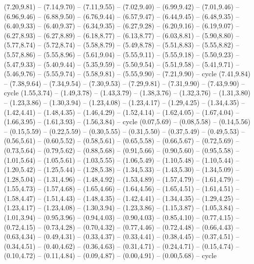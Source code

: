 \expandafter\def\csname geo:gebiet:heute-SWE\endcsname{
  (7.20,9.81) -- (7.14,9.70) -- (7.11,9.55) -- (7.02,9.40) -- (6.99,9.42) -- (7.01,9.46) -- (6.96,9.46) -- (6.88,9.50) -- (6.76,9.44) -- (6.57,9.47) -- (6.44,9.45) -- (6.48,9.35) -- (6.40,9.33) -- (6.40,9.37) -- (6.34,9.35) -- (6.27,9.28) -- (6.20,9.16) -- (6.19,9.07) -- (6.27,8.93) -- (6.27,8.89) -- (6.18,8.77) -- (6.13,8.77) -- (6.03,8.81) -- (5.90,8.80) -- (5.77,8.74) -- (5.72,8.74) -- (5.58,8.79) -- (5.49,8.78) -- (5.51,8.83) -- (5.55,8.82) -- (5.57,8.86) -- (5.55,8.96) -- (5.61,9.04) -- (5.55,9.11) -- (5.55,9.18) -- (5.50,9.23) -- (5.47,9.33) -- (5.40,9.44) -- (5.35,9.59) -- (5.50,9.54) -- (5.51,9.58) -- (5.41,9.71) -- (5.46,9.76) -- (5.55,9.74) -- (5.58,9.81) -- (5.55,9.90) -- (7.21,9.90) -- cycle
  (7.41,9.84) -- (7.38,9.64) -- (7.34,9.54) -- (7.30,9.53) -- (7.29,9.81) -- (7.31,9.90) -- (7.43,9.90) -- cycle}
\expandafter\def\csname geo:gebiet:heute-LUX\endcsname{
  (1.55,3.74) -- (1.49,3.78) -- (1.43,3.79) -- (1.38,3.76) -- (1.32,3.76) -- (1.31,3.80) -- (1.23,3.86) -- (1.30,3.94) -- (1.23,4.08) -- (1.23,4.17) -- (1.29,4.25) -- (1.34,4.35) -- (1.42,4.41) -- (1.48,4.35) -- (1.46,4.29) -- (1.52,4.14) -- (1.62,4.05) -- (1.67,4.04) -- (1.66,3.95) -- (1.61,3.93) -- (1.56,3.84) -- cycle}
\expandafter\def\csname geo:gebiet:heute-BEL\endcsname{
  (0.07,5.69) -- (0.08,5.58) -- (0.14,5.56) -- (0.15,5.59) -- (0.22,5.59) -- (0.30,5.55) -- (0.31,5.50) -- (0.37,5.49) -- (0.49,5.53) -- (0.56,5.61) -- (0.60,5.52) -- (0.58,5.61) -- (0.65,5.58) -- (0.66,5.67) -- (0.72,5.69) -- (0.73,5.64) -- (0.79,5.62) -- (0.88,5.68) -- (0.91,5.66) -- (0.90,5.60) -- (0.95,5.58) -- (1.01,5.64) -- (1.05,5.61) -- (1.03,5.55) -- (1.06,5.49) -- (1.10,5.48) -- (1.10,5.44) -- (1.20,5.42) -- (1.25,5.44) -- (1.28,5.38) -- (1.34,5.33) -- (1.43,5.30) -- (1.34,5.09) -- (1.28,5.04) -- (1.31,4.96) -- (1.48,4.92) -- (1.53,4.89) -- (1.57,4.79) -- (1.61,4.79) -- (1.55,4.73) -- (1.57,4.68) -- (1.65,4.66) -- (1.64,4.56) -- (1.65,4.51) -- (1.61,4.51) -- (1.58,4.47) -- (1.51,4.43) -- (1.48,4.35) -- (1.42,4.41) -- (1.34,4.35) -- (1.29,4.25) -- (1.23,4.17) -- (1.23,4.08) -- (1.30,3.94) -- (1.23,3.86) -- (1.15,3.87) -- (1.05,3.84) -- (1.01,3.94) -- (0.95,3.96) -- (0.94,4.03) -- (0.90,4.03) -- (0.85,4.10) -- (0.77,4.15) -- (0.72,4.15) -- (0.73,4.28) -- (0.70,4.32) -- (0.77,4.46) -- (0.72,4.48) -- (0.66,4.43) -- (0.63,4.34) -- (0.49,4.31) -- (0.33,4.37) -- (0.33,4.41) -- (0.38,4.45) -- (0.37,4.51) -- (0.34,4.51) -- (0.40,4.62) -- (0.36,4.63) -- (0.31,4.71) -- (0.24,4.71) -- (0.15,4.74) -- (0.10,4.72) -- (0.11,4.84) -- (0.09,4.87) -- (0.00,4.91) -- (0.00,5.68) -- cycle}
